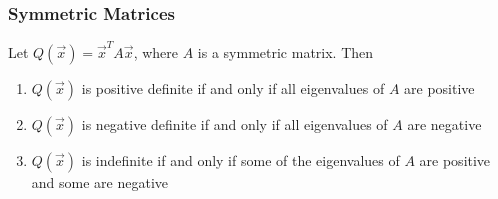 \documentclass[a4paper,9pt]{extarticle}
\begin{document}
\begin{multicols*}{2}
\subsubsection{Symmetric Matrices}
Let $Q(\vec{x}) = \vec{x}^T A \vec{x}$, where $A$ is a symmetric matrix. Then
\begin{enumerate}[label=\bfseries \arabic*.] \itemsep0pt \parskip0pt
    \item $Q(\vec{x})$ is positive definite if and only if all eigenvalues of $A$ are positive
    \item $Q(\vec{x})$ is negative definite if and only if all eigenvalues of $A$ are negative
    \item $Q(\vec{x})$ is indefinite if and only if some of the eigenvalues of $A$ are positive and some are negative
\end{enumerate}



\end{multicols*}
\end{document}
